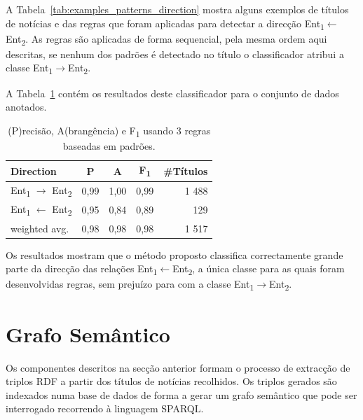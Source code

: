 \documentclass[a4paper, twocolumn, 11pt, twoside]{article}
\begin{document}
A Tabela~\ref{tab:examples_patterns_direction} mostra alguns exemplos de títulos de notícias e das regras que foram aplicadas para detectar a direcção Ent\textsubscript{1}$\leftarrow$Ent\textsubscript{2}. As regras são aplicadas de forma sequencial, pela mesma ordem aqui descritas, se nenhum dos padrões é detectado no título o classificador atribui a classe {Ent\textsubscript{1}$\rightarrow$Ent\textsubscript{2}}.

A Tabela~\ref{tab:direction_clf_results} contém os resultados deste classificador para o conjunto de dados anotados.

\begin{table}[!h]
    \begin{center}
    \begin{tabular}{l cccr}
        {\bf Direction} & {\bf P} & {\bf A} & {\bf F\textsubscript{1}} & {\bf \#Títulos} \\
        \hline
        \small{Ent\textsubscript{1} $\rightarrow$ Ent\textsubscript{2}} & 0,99  &  1,00  &  0,99  & 1 488 \\
		\small{Ent\textsubscript{1} $\leftarrow$ Ent\textsubscript{2}}  & 0,95  &  0,84  &  0,89  &   129  \\
		\hline
	    weighted avg.     &      0,98       & 0,98       & 0,98		&   1 517 \\
    \end{tabular}
	\caption{(P)recisão, A(brangência) e F\textsubscript{1} usando 3 regras baseadas em padrões.}
	\label{tab:direction_clf_results}
	\end{center}
\end{table}

Os resultados mostram que o método proposto classifica correctamente grande parte da direcção das relações Ent\textsubscript{1}$\leftarrow$Ent\textsubscript{2}, a única classe para as quais foram desenvolvidas regras, sem prejuízo para com a classe Ent\textsubscript{1}$\rightarrow$Ent\textsubscript{2}.

\section{Grafo Semântico}
\label{sec:pipeline}

Os componentes descritos na secção anterior formam o processo de extracção de triplos RDF a partir dos títulos de notícias recolhidos. Os triplos gerados são indexados numa base de dados de forma a gerar um grafo semântico que pode ser interrogado recorrendo à linguagem SPARQL.
\end{document}
